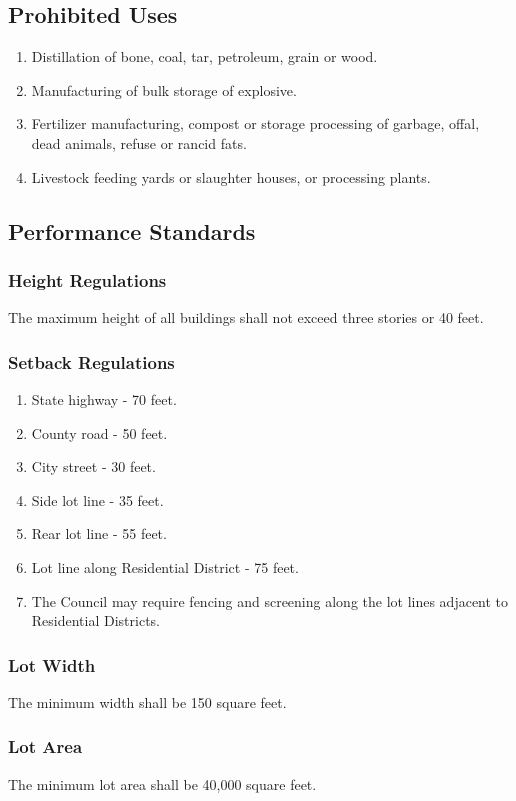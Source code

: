 \subsection{Prohibited Uses}
\begin{enumerate}[{\indent}1)]
    \item Distillation of bone, coal, tar, petroleum, grain or wood.
    \item Manufacturing of bulk storage of explosive.
    \item Fertilizer manufacturing, compost or storage processing of garbage, offal, dead animals, refuse or rancid fats.
    \item Livestock feeding yards or slaughter houses, or processing plants.
\end{enumerate}
\subsection{Performance Standards}
\subsubsection{Height Regulations}
The maximum height of all buildings shall not exceed three stories or 40 feet.
\subsubsection{Setback Regulations}
\begin{enumerate}[{\indent}a)]
    \item State highway - 70 feet.
    \item County road - 50 feet.
    \item City street - 30 feet.
    \item Side lot line - 35 feet.
    \item Rear lot line - 55 feet.
    \item Lot line along Residential District - 75 feet.
    \item The Council may require fencing and screening along the lot lines adjacent to Residential Districts.
\end{enumerate}
\subsubsection{Lot Width}
The minimum width shall be 150 square feet.
\subsubsection{Lot Area}
The minimum lot area shall be 40,000 square feet.
